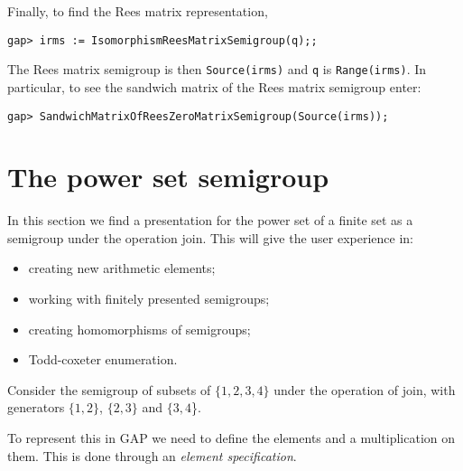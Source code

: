 \documentclass{ws-p8-50x6-00}
\theoremstyle{plain} \newtheorem{Thm}{Theorem}
\theoremstyle{plain} \newtheorem{Cor}{Corollary}
\theoremstyle{plain} \newtheorem{Lemma}{Lemma}
\theoremstyle{plain} \newtheorem{Prop}{Proposition}
\theoremstyle{plain} \newtheorem{Ex}{Exercise}
\def\gap{\sf GAP}
\begin{document}
Finally, to find the Rees matrix representation, 

\begin{verbatim}
gap> irms := IsomorphismReesMatrixSemigroup(q);;
\end{verbatim}

The Rees matrix semigroup is then {\tt Source(irms)} and 
{\tt q} is {\tt Range(irms)}.  In particular, to see the 
sandwich matrix of the Rees matrix semigroup
enter:

\begin{verbatim}
gap> SandwichMatrixOfReesZeroMatrixSemigroup(Source(irms));
\end{verbatim}


\section{The power set semigroup}
In this section we find a presentation for the power set
of a finite set as a semigroup under the operation join.  
This will give the user experience in:
\begin{itemize}
\item creating new arithmetic elements;
\item working with finitely presented semigroups;
\item creating homomorphisms of semigroups;
\item Todd-coxeter enumeration.
\end{itemize}

Consider the semigroup of subsets of $\{1,2,3,4\}$ under the operation
of join, with generators
$\{1, 2\}$, $\{2, 3\}$ and $\{3, 4$\}.

To represent this in {\gap} we need to define the elements and a
multiplication on them. This is done through an {\em element specification}.
\end{document}
